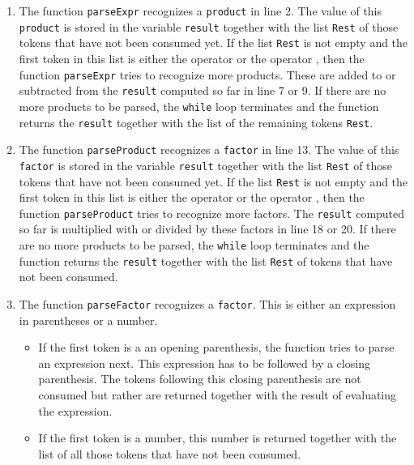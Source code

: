 \begin{enumerate}
\item The function \texttt{parseExpr} recognizes a \texttt{product} in line 2. 
      The value of this \texttt{product} is stored in the variable 
      \texttt{result} together with the list \texttt{Rest} of those tokens that have not been consumed
      yet.  If the list \texttt{Rest} is not empty and the first token in this
      list is either the operator \squoted{+} or the operator \squoted{-},
      then the function \texttt{parseExpr} tries to recognize more products.
      These are added to or subtracted from the \texttt{result} computed so far in
      line 7 or 9.  If there are no more products to be parsed, the \texttt{while} loop 
      terminates and the function returns the \texttt{result} together with the list of the remaining
      tokens \texttt{Rest}.
\item The function \texttt{parseProduct} recognizes a \texttt{factor} in line 13. 
      The value of this \texttt{factor} is stored in the variable 
      \texttt{result} together with the list \texttt{Rest} of those tokens that have not been consumed
      yet.  If the list \texttt{Rest} is not empty and the first token in this
      list is either the operator \squoted{*} or the operator \squoted{/},
      then the function \texttt{parseProduct} tries to recognize more factors.
      The \texttt{result} computed so far is multiplied with or divided by these factors in
      line 18 or 20.  If there are no more products to be parsed, the \texttt{while} loop 
      terminates and the function returns the \texttt{result} together with the list
      \texttt{Rest} of tokens that have not been consumed.
\item The function \texttt{parseFactor} recognizes a \texttt{factor}.
      This is either an expression in parentheses or a number.
      \begin{itemize}
      \item If the first token is a an opening parenthesis, the function tries to parse
            an expression next.  This expression has to be followed by a closing parenthesis.
            The tokens following this closing parenthesis are not consumed but rather are returned 
            together with the result of evaluating the expression.
      \item If the first token is a number, this number is returned together with the list
            of all those tokens that have not been consumed.
      \end{itemize}
\end{enumerate}

